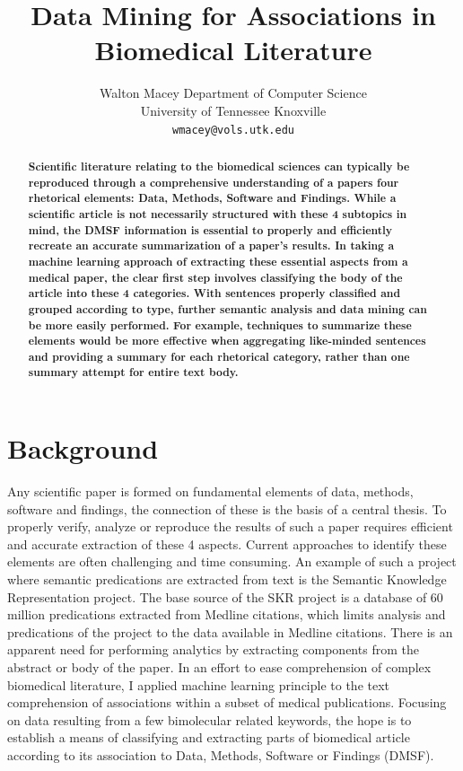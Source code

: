 \documentclass{article} %
\title{Data Mining for Associations in Biomedical Literature}
\author{
Walton Macey
Department of Computer Science\\
University of Tennessee Knoxville\\
\texttt{wmacey@vols.utk.edu} \\
}
\begin{document}
\maketitle

\begin{abstract}
{\bf Scientific literature relating to the biomedical sciences can typically be reproduced through a comprehensive understanding of a papers four rhetorical elements: Data, Methods, Software and Findings. While a scientific article is not necessarily structured with these 4 subtopics in mind, the DMSF information is essential to properly and efficiently recreate an accurate summarization of a paper’s results. In taking a machine learning approach of extracting these essential aspects from a medical paper, the clear first step involves classifying the body of the article into these 4 categories. With sentences properly classified and grouped according to type, further semantic analysis and data mining can be more easily performed. For example, techniques to summarize these elements would be more effective when aggregating like-minded sentences and providing a summary for each rhetorical category, rather than one summary attempt for entire text body.}
\end{abstract}

\section{Background}
Any scientific paper is formed on fundamental elements of data, methods, software and findings, the connection of these is the basis of a central thesis. To properly verify, analyze or reproduce the results of such a paper requires efficient and accurate extraction of these 4 aspects. Current approaches to identify these elements are often challenging and time consuming. An example of such a project where semantic predications are extracted from text is the Semantic Knowledge Representation project. The base source of the SKR project is a database of 60 million predications extracted from Medline citations, which limits analysis and predications of the project to the data available in Medline citations. There is an apparent need for performing analytics by extracting components from the abstract or body of the paper. In an effort to ease comprehension of complex biomedical literature, I applied machine learning principle to the text comprehension of associations within a subset of medical publications. Focusing on data resulting from a few bimolecular related keywords, the hope is to establish a means of classifying and extracting parts of biomedical article according to its association to Data, Methods, Software or Findings (DMSF).
\end{document}
